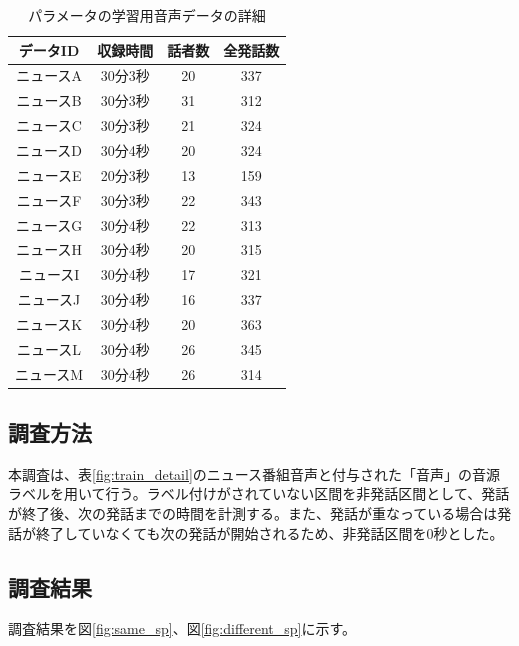 \begin{table}[H]
  \begin{center}
    \caption{パラメータの学習用音声データの詳細　\label{table:train_detail}}
    \begin{tabular}{|c||c|c|c|} \hline
      データID & 収録時間 & 話者数 & 全発話数 \\ \hline
      ニュースA & 30分3秒 & 20 & 337 \\ \hline
      ニュースB & 30分3秒 & 31 & 312\\ \hline
      ニュースC & 30分3秒 & 21 & 324 \\ \hline
      ニュースD & 30分4秒 & 20 & 324\\ \hline
      ニュースE & 20分3秒 & 13 & 159\\ \hline
      ニュースF & 30分3秒 & 22 & 343\\ \hline
      ニュースG & 30分4秒 & 22 & 313\\ \hline
      ニュースH & 30分4秒 & 20 & 315\\ \hline
      ニュースI & 30分4秒 & 17 & 321\\ \hline
      ニュースJ & 30分4秒 & 16 & 337\\ \hline
      ニュースK & 30分4秒 & 20 & 363\\ \hline
      ニュースL & 30分4秒 & 26 & 345\\ \hline
      ニュースM & 30分4秒 & 26 & 314\\ \hline
    \end{tabular}
  \end{center}
\end{table}

\subsection{調査方法}
本調査は、表\ref{fig:train_detail}のニュース番組音声と付与された「音声」の音源ラベルを用いて行う。ラベル付けがされていない区間を非発話区間として、発話が終了後、次の発話までの時間を計測する。また、発話が重なっている場合は発話が終了していなくても次の発話が開始されるため、非発話区間を0秒とした。

\subsection{調査結果}
調査結果を図\ref{fig:same_sp}、図\ref{fig:different_sp}に示す。

